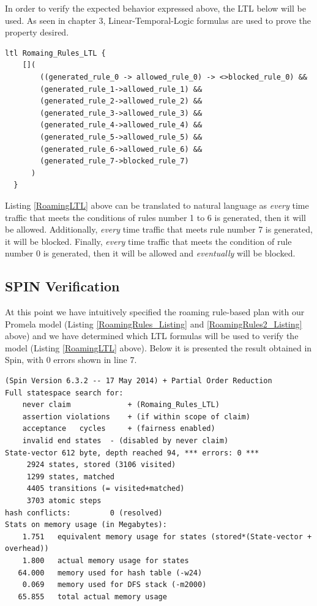 In order to verify the expected behavior expressed above, the LTL below will be used. As seen in chapter 3, Linear-Temporal-Logic formulas are used to prove the property desired. 

\singlespacing
\begin{lstlisting}[caption=Roaming-Rules LTL,
  label=RoamingLTL]
  ltl Romaing_Rules_LTL {
    []( 
        ((generated_rule_0 -> allowed_rule_0) -> <>blocked_rule_0) &&
        (generated_rule_1->allowed_rule_1) &&
        (generated_rule_2->allowed_rule_2) &&
        (generated_rule_3->allowed_rule_3) &&
        (generated_rule_4->allowed_rule_4) &&
        (generated_rule_5->allowed_rule_5) &&
        (generated_rule_6->allowed_rule_6) &&
        (generated_rule_7->blocked_rule_7)
      )
  }
\end{lstlisting}
\doublespacing

Listing \ref{RoamingLTL} above can be translated to natural language as \emph{every} time traffic that meets the conditions of rules number 1 to 6 is generated, then it will be allowed. Additionally, \emph{every} time traffic that meets rule number 7 is generated, it will be blocked. Finally, \emph{every} time traffic that meets the condition of rule number 0 is generated, then it will be allowed and \emph{eventually} will be blocked. 

\subsection{SPIN Verification}
\noindent 
At this point we have intuitively specified the roaming rule-based plan with our Promela model (Listing \ref{RoamingRules_Listing} and \ref{RoamingRules2_Listing} above) and we have determined which LTL formulas will be used to verify the model (Listing \ref{RoamingLTL} above). Below it is presented the result obtained in Spin, with 0 errors shown in line 7.

\singlespacing
\begin{lstlisting}[caption=Core-Rules Plan Verification,
  label=RoamingResult]
(Spin Version 6.3.2 -- 17 May 2014) + Partial Order Reduction
Full statespace search for:
	never claim         	+ (Romaing_Rules_LTL)
	assertion violations	+ (if within scope of claim)
	acceptance   cycles 	+ (fairness enabled)
	invalid end states	- (disabled by never claim)
State-vector 612 byte, depth reached 94, *** errors: 0 ***
     2924 states, stored (3106 visited)
     1299 states, matched
     4405 transitions (= visited+matched)
     3703 atomic steps
hash conflicts:         0 (resolved)
Stats on memory usage (in Megabytes):
    1.751	equivalent memory usage for states (stored*(State-vector + overhead))
    1.800	actual memory usage for states
   64.000	memory used for hash table (-w24)
    0.069	memory used for DFS stack (-m2000)
   65.855	total actual memory usage
\end{lstlisting}
\doublespacing

